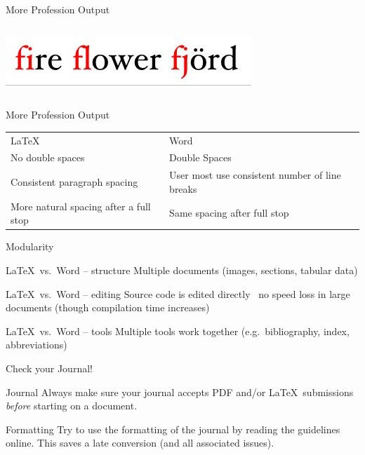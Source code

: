 \documentclass[final,aspectratio=43]{beamer}
\begin{document}
\begin{frame}{More Profession Output}
\begin{columns}
\begin{column}{0.5\linewidth}
\begin{center}
            \includegraphics[width=\linewidth]{figures/ligatures_word}
            
            \end{center}
        \end{column}
    \end{columns}
\end{frame}

\begin{frame}{More Profession Output}
    \centering
    \renewcommand{\arraystretch}{2}
    \begin{tabularx}{0.9\linewidth}{X@{\hskip 1cm}X}
    {\Huge\LaTeX} & {\Huge Word} \\
    No double spaces & Double Spaces \\
    Consistent paragraph spacing & User most use consistent number of line breaks \\
    More natural spacing after a full stop & Same spacing after full stop \\
    \end{tabularx}
\end{frame}

\begin{frame}{Modularity}
    \begin{block}{\LaTeX\ vs.\ Word -- structure}
        Multiple documents (images, sections, tabular data)
    \end{block}
    
    \begin{block}{\LaTeX\ vs.\ Word -- editing}
        Source code is edited directly \textrightarrow\ no speed loss in large documents (though compilation time increases)
    \end{block}
    
    \begin{block}{\LaTeX\ vs.\ Word -- tools}
        Multiple tools work together (e.g.\ bibliography, index, abbreviations)
    \end{block}
\end{frame}

\begin{frame}{Check your Journal!}
    \begin{alertblock}{Journal}
        Always make sure your journal accepts PDF and/or \LaTeX\ submissions \emph{before} starting on a document.
    \end{alertblock}
    
    \begin{alertblock}{Formatting}
        Try to use the formatting of the journal by reading the guidelines online. This saves a late conversion (and all associated issues).
    \end{alertblock}
\end{frame}
\end{document}
